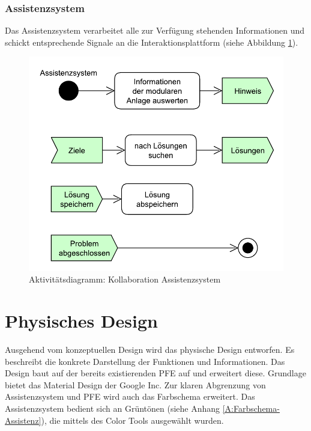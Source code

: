 \subsubsection*{Assistenzsystem}
Das Assistenzsystem verarbeitet alle zur Verfügung stehenden Informationen und schickt entsprechende Signale an die Interaktionsplattform (siehe Abbildung \ref{pic:Kollaboration-Assistenzsystem}).
\begin{figure}[htbp]
\centering
\includegraphics[scale=0.5]{DA_files/UML/Konzept/Aktivitaetsdiagramm-Assistenz.pdf}
\caption{Aktivitätsdiagramm: Kollaboration Assistenzsystem}
\label{pic:Kollaboration-Assistenzsystem}
\end{figure}

\section{Physisches Design}
\label{4:Physikalische-Design}
Ausgehend vom konzeptuellen Design wird das physische Design entworfen. Es beschreibt die konkrete Darstellung der Funktionen und Informationen. Das Design baut auf der bereits existierenden PFE auf und erweitert diese. Grundlage bietet das Material Design \cite{MaterialDesign} der Google Inc. Zur klaren Abgrenzung von Assistenzsystem und PFE wird auch das Farbschema erweitert. Das Assistenzsystem bedient sich an Grüntönen (siehe Anhang \ref{A:Farbschema-Assistenz}), die mittels des Color Tools \cite{ColorTool} ausgewählt wurden.

